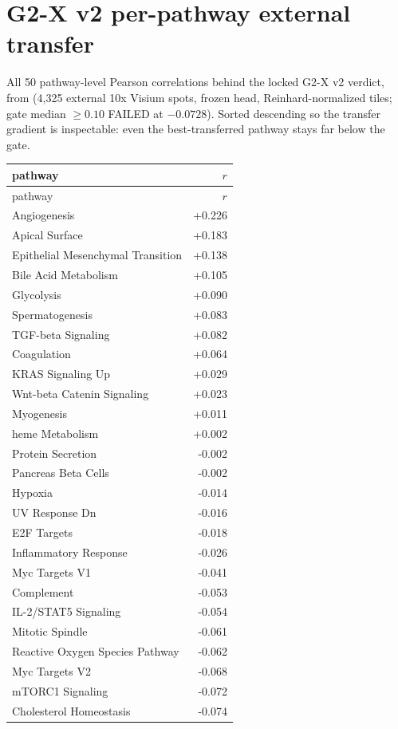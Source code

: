 \section{G2-X v2 per-pathway external transfer}
{\sloppy All 50 pathway-level Pearson correlations behind the locked G2-X v2 verdict, from  (4{,}325 external 10x Visium spots, frozen head, Reinhard-normalized tiles; gate median $\ge 0.10$ FAILED at $-0.0728$). Sorted descending so the transfer gradient is inspectable: even the best-transferred pathway stays far below the gate.\par}
\begin{longtable}{lr}\hline\hline pathway & $r$\\\hline
\endfirsthead\hline\hline pathway & $r$\\\hline\endhead
Angiogenesis & +0.226\\
Apical Surface & +0.183\\
Epithelial Mesenchymal Transition & +0.138\\
Bile Acid Metabolism & +0.105\\
Glycolysis & +0.090\\
Spermatogenesis & +0.083\\
TGF-beta Signaling & +0.082\\
Coagulation & +0.064\\
KRAS Signaling Up & +0.029\\
Wnt-beta Catenin Signaling & +0.023\\
Myogenesis & +0.011\\
heme Metabolism & +0.002\\
Protein Secretion & -0.002\\
Pancreas Beta Cells & -0.002\\
Hypoxia & -0.014\\
UV Response Dn & -0.016\\
E2F Targets & -0.018\\
Inflammatory Response & -0.026\\
Myc Targets V1 & -0.041\\
Complement & -0.053\\
IL-2/STAT5 Signaling & -0.054\\
Mitotic Spindle & -0.061\\
Reactive Oxygen Species Pathway & -0.062\\
Myc Targets V2 & -0.068\\
mTORC1 Signaling & -0.072\\
Cholesterol Homeostasis & -0.074\\

\end{longtable}
